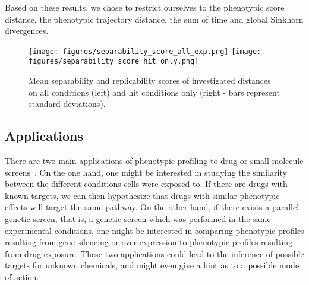 Based on these results, we chose to restrict ourselves to the
phenotypic score distance, the phenotypic trajectory distance, the sum
of time and global Sinkhorn divergences. 


\begin{figure*}[ht!]
\centerline{
\texttt{[image: figures/separability\_score\_all\_exp.png]}
\texttt{[image: figures/separability\_score\_hit\_only.png]}
}
\caption{Mean separability and replicability scores of investigated distances on all conditions (left) and hit conditions only (right - bars represent standard deviations).}
\label{separability}
\end{figure*}

\subsection{Applications}
\label{sec:applications}
There are two main applications of phenotypic profiling to drug or
small molecule screens~\cite{pmid17401369}. On the one hand, one might
be interested in studying the similarity between the different
conditions cells were exposed to. If there are drugs with known
targets, we can then hypothesize that drugs with similar phenotypic effects
will target the same pathway. 
On the other hand, if there exists a
parallel genetic screen, that is, a genetic screen which was performed
in the same experimental conditions, one might be interested in
comparing phenotypic profiles resulting from gene silencing or
over-expression to phenotypic profiles resulting from drug
exposure. These two applications could lead to the inference of
possible targets for unknown chemicals, and might even give a hint as
to a possible mode of action. 

